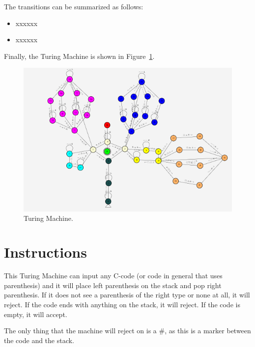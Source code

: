 \documentclass{article}
\begin{document}
The transitions can be summarized as follows:
\begin{itemize}
    \item xxxxxx
    \item xxxxxx
\end{itemize}

Finally, the Turing Machine is shown in Figure\ \ref{fig:stackqueue}.
\begin{figure}
    \includegraphics[width=\linewidth]{stackqueue.png}
    \caption{Turing Machine.}\label{fig:stackqueue}
\end{figure}

\section{Instructions}
This Turing Machine can input any C-code (or code in general that uses parenthesis) and it will place left parenthesis on the stack and pop
right parenthesis. If it does not see a parenthesis of the right type or none at all, it will reject. If the code ends with anything on the
stack, it will reject. If the code is empty, it will accept. 

The only thing that the machine will reject on is a $\#$, as this is a marker between the code and the stack.
\end{document}

